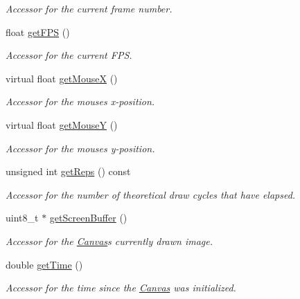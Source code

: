 \begin{DoxyCompactItemize}
\begin{DoxyCompactList}\small\item\em Accessor for the current frame number. \end{DoxyCompactList}\item 
float \hyperlink{classtsgl_1_1_canvas_a1c8ac321138948650a3006f325dfb886}{get\+F\+PS} ()
\begin{DoxyCompactList}\small\item\em Accessor for the current F\+PS. \end{DoxyCompactList}\item 
virtual float \hyperlink{classtsgl_1_1_canvas_aae30eddfb15b6a549dc162e4a11a149d}{get\+MouseX} ()
\begin{DoxyCompactList}\small\item\em Accessor for the mouse\textquotesingle{}s x-\/position. \end{DoxyCompactList}\item 
virtual float \hyperlink{classtsgl_1_1_canvas_a5e86e0938a5c228c1c947f995389bd45}{get\+MouseY} ()
\begin{DoxyCompactList}\small\item\em Accessor for the mouse\textquotesingle{}s y-\/position. \end{DoxyCompactList}\item 
unsigned int \hyperlink{classtsgl_1_1_canvas_a7340a669569360e83a4b431dea91d400}{get\+Reps} () const
\begin{DoxyCompactList}\small\item\em Accessor for the number of theoretical draw cycles that have elapsed. \end{DoxyCompactList}\item 
uint8\+\_\+t $\ast$ \hyperlink{classtsgl_1_1_canvas_a71f072dd82ca3b5cecfd65cde6d8a226}{get\+Screen\+Buffer} ()
\begin{DoxyCompactList}\small\item\em Accessor for the \hyperlink{classtsgl_1_1_canvas}{Canvas}\textquotesingle{}s currently drawn image. \end{DoxyCompactList}\item 
double \hyperlink{classtsgl_1_1_canvas_aef462ab48e59571b9c88076bbdc8f0b3}{get\+Time} ()
\begin{DoxyCompactList}\small\item\em Accessor for the time since the \hyperlink{classtsgl_1_1_canvas}{Canvas} was initialized. \end{DoxyCompactList}\item 

\end{DoxyCompactItemize}
